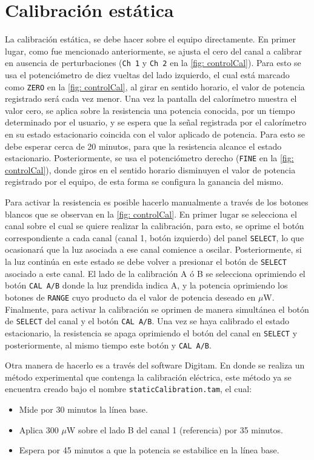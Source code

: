 	\section{Calibraci\'on est\'atica}
	La calibración estática, se debe hacer sobre el equipo directamente. En primer lugar, como fue mencionado anteriormente, se ajusta el cero del canal a calibrar en ausencia de perturbaciones (\texttt{Ch 1} y \texttt{Ch 2} en la \autoref{fig: controlCal}). Para esto se usa el potenciómetro de diez vueltas del lado izquierdo, el cual está marcado como \texttt{ZERO} en la \autoref{fig: controlCal}, al girar en sentido horario, el valor de potencia registrado será cada vez menor. Una vez la pantalla del calor\'imetro muestra el valor cero, se aplica sobre la resistencia una potencia conocida, por un tiempo determinado por el usuario, y se espera que la señal registrada por el calorímetro en su estado estacionario coincida con el valor aplicado de potencia. Para esto se debe esperar cerca de 20 minutos, para que la resistencia alcance el estado estacionario. Posteriormente, se usa el potenciómetro derecho (\texttt{FINE} en la \autoref{fig: controlCal}), donde giros en el sentido horario disminuyen el valor de potencia registrado por el equipo, de esta forma se configura la ganancia del mismo.

	Para activar la resistencia es posible hacerlo manualmente a través de los botones blancos que se observan en la \autoref{fig: controlCal}. En primer lugar se selecciona el canal sobre el cual se quiere realizar la calibración, para esto, se oprime el botón correspondiente a cada canal (canal 1, botón izquierdo) del panel \texttt{SELECT}, lo que ocasionará que la luz asociada a ese canal comience a oscilar. Posteriormente, si la luz continúa en este estado se debe volver a presionar el botón de \texttt{SELECT} asociado a este canal. El lado de la calibración A ó B se selecciona oprimiendo el botón \texttt{CAL A/B} donde la luz prendida indica A, y la potencia oprimiendo los botones de \texttt{RANGE} cuyo producto da el valor de potencia deseado en $\mu$W. Finalmente, para activar la calibración se oprimen de manera simultánea el botón de \texttt{SELECT} del canal y el botón \texttt{CAL A/B}. Una vez se haya calibrado el estado estacionario, la resistencia se apaga oprimiendo el botón del canal en \texttt{SELECT} y posteriormente, al mismo tiempo este botón y \texttt{CAL A/B}.
	
	Otra manera de hacerlo es a través del software Digitam. En donde se realiza un método experimental que contenga la calibración eléctrica, este método ya se encuentra creado bajo el nombre \texttt{staticCalibration.tam}, el cual:
	\begin{itemize}
		\item Mide por 30 minutos la línea base.
		\item Aplica 300 $\mu$W sobre el lado B del canal 1 (referencia) por 35 minutos.
		\item Espera por 45 minutos a que la potencia se estabilice en la línea base.
	\end{itemize}

